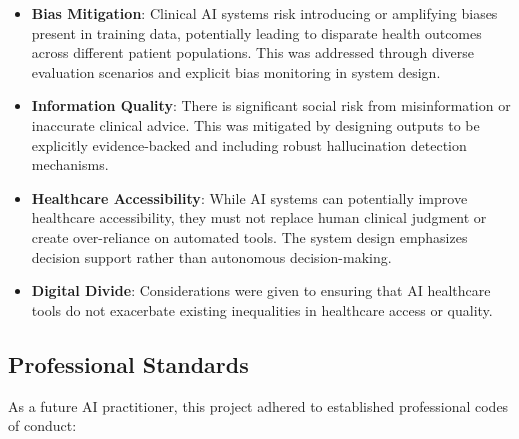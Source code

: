 \begin{itemize}
    \item \textbf{Bias Mitigation}: Clinical AI systems risk introducing or amplifying biases present in training data, potentially leading to disparate health outcomes across different patient populations. This was addressed through diverse evaluation scenarios and explicit bias monitoring in system design.
    
    \item \textbf{Information Quality}: There is significant social risk from misinformation or inaccurate clinical advice. This was mitigated by designing outputs to be explicitly evidence-backed and including robust hallucination detection mechanisms.
    
    \item \textbf{Healthcare Accessibility}: While AI systems can potentially improve healthcare accessibility, they must not replace human clinical judgment or create over-reliance on automated tools. The system design emphasizes decision support rather than autonomous decision-making.
    
    \item \textbf{Digital Divide}: Considerations were given to ensuring that AI healthcare tools do not exacerbate existing inequalities in healthcare access or quality.
\end{itemize}

\subsection{Professional Standards}

As a future AI practitioner, this project adhered to established professional codes of conduct:

